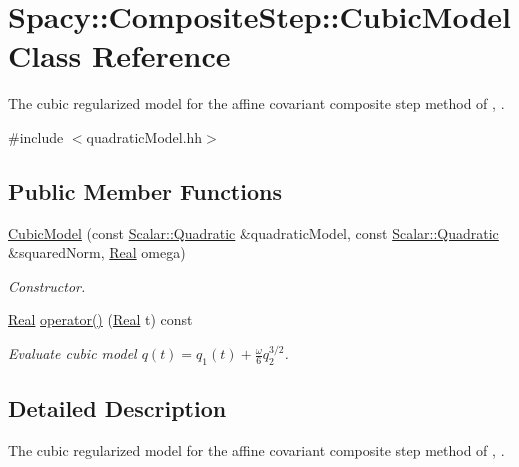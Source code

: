 \hypertarget{classSpacy_1_1CompositeStep_1_1CubicModel}{\section{Spacy\-:\-:Composite\-Step\-:\-:Cubic\-Model Class Reference}
\label{classSpacy_1_1CompositeStep_1_1CubicModel}
}


The cubic regularized model for the affine covariant composite step method of \cite{Lubkoll2015}, \cite{Lubkoll2015a}.  




{\ttfamily \#include $<$quadratic\-Model.\-hh$>$}

\subsection*{Public Member Functions}
\begin{DoxyCompactItemize}
\item 
\hyperlink{classSpacy_1_1CompositeStep_1_1CubicModel_aebf63b0a86934fd43bf1b2bc28821f25}{Cubic\-Model} (const \hyperlink{classSpacy_1_1Scalar_1_1Quadratic}{Scalar\-::\-Quadratic} \&quadratic\-Model, const \hyperlink{classSpacy_1_1Scalar_1_1Quadratic}{Scalar\-::\-Quadratic} \&squared\-Norm, \hyperlink{classSpacy_1_1Real}{Real} omega)
\begin{DoxyCompactList}\small\item\em Constructor. \end{DoxyCompactList}\item 
\hyperlink{classSpacy_1_1Real}{Real} \hyperlink{classSpacy_1_1CompositeStep_1_1CubicModel_a5669f387117cfdc47b5be45a29f387ce}{operator()} (\hyperlink{classSpacy_1_1Real}{Real} t) const 
\begin{DoxyCompactList}\small\item\em Evaluate cubic model $ q(t) = q_1(t) + \frac{\omega}{6}q_2^{3/2} $. \end{DoxyCompactList}\end{DoxyCompactItemize}


\subsection{Detailed Description}
The cubic regularized model for the affine covariant composite step method of \cite{Lubkoll2015}, \cite{Lubkoll2015a}. 

